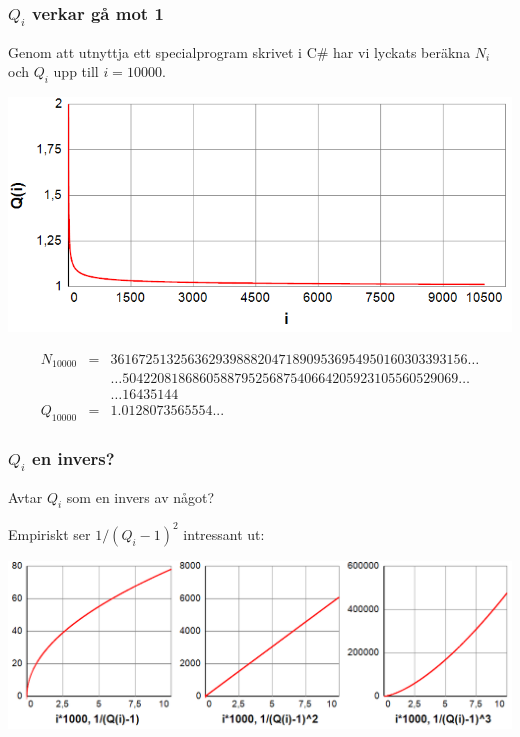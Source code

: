 \documentclass{beamer}
\begin{document}
\begin{frame}
	\frametitle{$Q_i$ verkar gå mot 1}
	Genom att utnyttja ett specialprogram skrivet i C\# har vi lyckats beräkna $N_i$ och $Q_i$ upp till $i=10000$.
	
	\begin{center}
		\includegraphics[scale=0.5]{Export/Complexity12.png}
	\end{center}
	
	{\scriptsize
	\[
	\begin{array}{rcl}
	N_{10000} & = & 361672513256362939888204718909536954950160303393156\ldots\\
	& & \ldots504220818686058879525687540664205923105560529069\ldots\\
	& & \ldots16435144\\
	Q_{10000} & = & 1.0128073565554...
	\end{array}
	\]
	}
\end{frame}

\begin{frame}
	\frametitle{$Q_i$ en invers?}
	{
		\Large
		Avtar $Q_i$ som en invers av något?
	}
	
	\vspace{20pt}
	Empiriskt ser $1/(Q_i-1)^2$ intressant ut:
	\begin{center}
		\includegraphics[scale=0.5]{Export/Complexity13.png}
	\end{center}
\end{frame}
\end{document}
